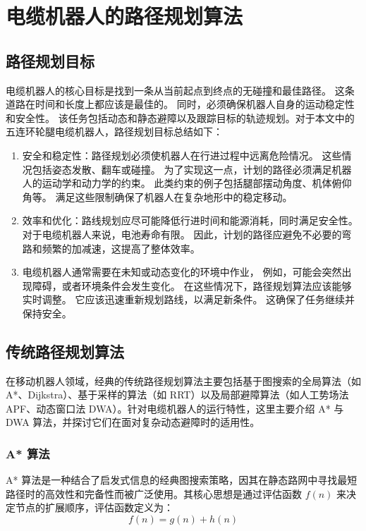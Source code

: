 \chapter{电缆机器人的路径规划算法}\label{chap:path_planning}
\section{路径规划目标}

电缆机器人的核心目标是找到一条从当前起点到终点的无碰撞和最佳路径。 这条道路在时间和长度上都应该是最佳的。 同时，必须确保机器人自身的运动稳定性和安全性。 该任务包括动态和静态避障以及跟踪目标的轨迹规划\cite{use-gru2}。对于本文中的五连环轮腿电缆机器人，路径规划目标总结如下：

\begin{enumerate}
\item 安全和稳定性：路径规划必须使机器人在行进过程中远离危险情况。 这些情况包括姿态发散、翻车或碰撞。 为了实现这一点，计划的路径必须满足机器人的运动学和动力学的约束。 此类约束的例子包括腿部摆动角度、机体俯仰角等。 满足这些限制确保了机器人在复杂地形中的稳定移动。

\item 效率和优化：路线规划应尽可能降低行进时间和能源消耗，同时满足安全性。 对于电缆机器人来说，电池寿命有限。 因此，计划的路径应避免不必要的弯路和频繁的加减速，这提高了整体效率。

\item 电缆机器人通常需要在未知或动态变化的环境中作业， 例如，可能会突然出现障碍，或者环境条件会发生变化。 在这些情况下，路径规划算法应该能够实时调整。 它应该迅速重新规划路线，以满足新条件。 这确保了任务继续并保持安全。

\end{enumerate}

\section{传统路径规划算法}
在移动机器人领域，经典的传统路径规划算法主要包括基于图搜索的全局算法（如 A*、Dijkstra）、基于采样的算法（如 RRT）以及局部避障算法（如人工势场法 APF、动态窗口法 DWA）\cite{XTFZ20260515001}。针对电缆机器人的运行特性，这里主要介绍 A* 与 DWA 算法，并探讨它们在面对复杂动态避障时的适用性。

\subsection{A* 算法}
A* 算法是一种结合了启发式信息的经典图搜索策略，因其在静态路网中寻找最短路径时的高效性和完备性而被广泛使用\cite{astar}。其核心思想是通过评估函数 $f(n)$ 来决定节点的扩展顺序，评估函数定义为：
\begin{equation}
    f(n) = g(n) + h(n)
\end{equation}

